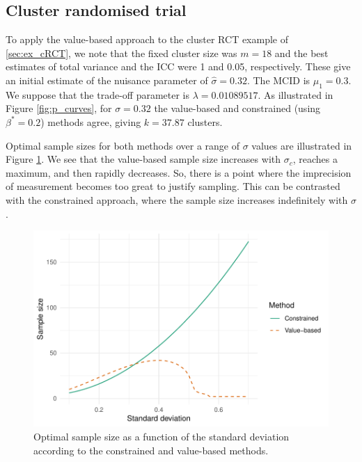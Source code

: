 \documentclass[sagev, Crown]{sagej}
\begin{document}
\subsection{Cluster randomised trial}

To apply the value-based approach to the cluster RCT example of \ref{sec:ex_cRCT}, we note that the fixed cluster size was $m = 18$ and the best estimates of total variance and the ICC were 1 and 0.05, respectively. These give an initial estimate of the nuisance parameter of $\hat{\sigma} = 0.32$. The MCID is $\mu_1 = 0.3$. We suppose that the trade-off parameter is $\lambda = 0.01089517$. As illustrated in Figure \ref{fig:p_curves}, for  $\sigma = 0.32$ the value-based and constrained (using $\beta^* = 0.2$) methods agree, giving $ k = 37.87$ clusters.

Optimal sample sizes for both methods over a range of $\sigma$ values are illustrated in Figure \ref{fig:opt_t_test}. We see that the value-based sample size increases with $\sigma_c$, reaches a maximum, and then rapidly decreases. So, there is a point where the imprecision of measurement becomes too great to justify sampling. This can be contrasted with the constrained approach, where the sample size increases indefinitely with $\sigma$.

\begin{figure}
\centering
\includegraphics[scale=0.8]{./figures/opt_t_test}
\caption{Optimal sample size as a function of the standard deviation according to the constrained and value-based methods.}
\label{fig:opt_t_test}
\end{figure}
\end{document}
